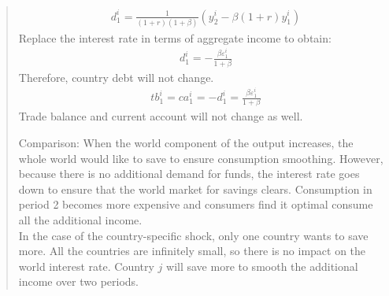 \begin{exercise}
\begin{quote}
\begin{enumerate}
\begin{enumerate}
 \begin{align*}
&d^i_1 = \frac{1}{(1+r)(1+\beta)}(y^i_2 - \beta(1+r)y^i_1)
\end{align*}
Replace the interest rate in terms of aggregate income to obtain:
 \begin{align*}
& d^i_1 = -\frac{\beta \varepsilon_1^i}{1+\beta}
\end{align*}
Therefore, country debt will not change.
\begin{align*}
&tb^i_1 = ca^i_1 =  -d_1^i = \frac{\beta \varepsilon_1^i}{1+\beta}
\end{align*} 
 Trade balance and current account will not change as well.
\end{enumerate}

Comparison:  When the world component of the output increases, the whole world would like to save to ensure consumption smoothing. However, because there is no additional demand for funds, the interest rate goes down to ensure that the world market for savings clears. Consumption in period 2 becomes more expensive and consumers find it optimal consume all the additional income.
\\ In the case of the country-specific shock, only one country wants to save more. All the countries are infinitely small, so there is no impact on the world interest rate. Country $j$  will save more to smooth the additional income over two periods.
\end{enumerate}  
\end{quote}
\end{exercise}

